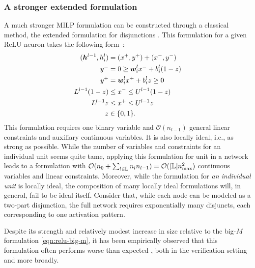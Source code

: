 \subsubsection{A stronger extended formulation} 
A much stronger MILP formulation can be constructed through a classical method, the extended formulation for disjunctions \citep{balas1998disjunctive,jeroslow1984modelling}. This formulation for a given ReLU neuron takes the following form~\citep[Section 2.2]{anderson2019strong}:
\begin{subequations} \label{eqn:balas-relu}
\begin{align}
    ({\bm{h}}^{l-1},h^l_i) &= (x^+,y^+) + (x^-,y^-) \label{eqn:balas-relu-1} \\
    y^- &= 0 \geq {\bm{w}}^{l}_i x^- + b^l_i(1-z) \\
    y^+ &= {\bm{w}}^{l}_i x^+ + b^l_iz \geq 0 \\
    L^{l-1}(1-z) &\leq x^- \leq U^{l-1}(1-z) \\
    L^{l-1}z &\leq x^+ \leq U^{l-1}z \label{eqn:balas-relu-5} \\
    z &\in \{0,1\}. \label{eqn:balas-relu-6}
\end{align}
\end{subequations}
This formulation requires one binary variable and $\mathcal{O}(n_{l-1})$ general linear constraints and auxiliary continuous variables. It is also locally ideal, i.e., as strong as possible. While the number of variables and constraints for an individual unit seems quite tame, applying this formulation for unit in a network leads to a formulation with $\mathcal{O}(n_0 + \sum_{l \in {\mathbb{L}}} n_ln_{l-1}) = \mathcal{O}(|{\mathbb{L}}|n_{\max}^2)$ continuous variables and linear constraints. Moreover, while the formulation for \emph{an individual unit} is locally ideal, the composition of many locally ideal formulations will, in general, fail to be ideal itself. 
Consider that, while each node can be modeled as a two-part disjunction, the full network requires exponentially many disjuncts, each corresponding to one activation pattern. 

Despite its strength and relatively modest increase in size relative to the big-$M$ formulation \eqref{eqn:relu-big-m}, it has been empirically observed that this formulation often performs worse than expected \citep{anderson2019strong,vielma2019small}, both in the verification setting and more broadly.

